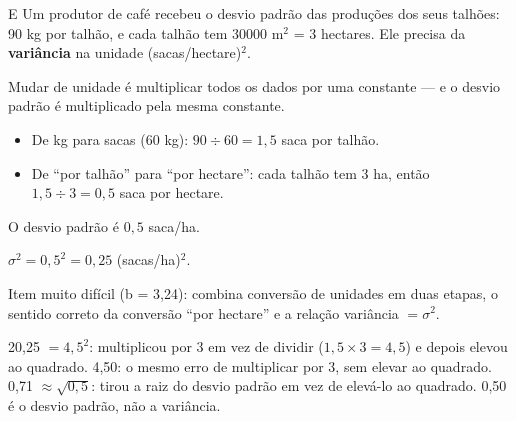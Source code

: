 \begin{resolucao}{E}
 Um produtor de café recebeu o desvio padrão das produções dos seus
talhões: 90 kg por talhão, e cada talhão tem \num{30000} m$^2$ = 3 hectares. Ele precisa da
\textbf{variância} na unidade (sacas/hectare)$^2$.

 Mudar de unidade é multiplicar
todos os dados por uma constante — e o desvio padrão é multiplicado pela mesma constante.
\begin{itemize}[nosep,leftmargin=1.2em]
  \item De kg para sacas (60 kg): $90 \div 60 = 1{,}5$ saca por talhão.
  \item De “por talhão” para “por hectare”: cada talhão tem 3 ha, então $1{,}5 \div 3 = 0{,}5$ saca por hectare.
\end{itemize}
O desvio padrão é $0{,}5$ saca/ha.

 $\sigma^2 = 0{,}5^2 = 0{,}25$ (sacas/ha)$^2$.


Item muito difícil (b = 3,24): combina conversão de unidades em duas etapas, o sentido correto da
conversão “por hectare” e a relação variância $= \sigma^2$.

\begin{distratores}
 20,25 $= 4{,}5^2$: multiplicou por 3 em vez de dividir ($1{,}5 \times 3 = 4{,}5$) e depois elevou ao quadrado.
 4,50: o mesmo erro de multiplicar por 3, sem elevar ao quadrado.
 0,71 $\approx \sqrt{0{,}5}$: tirou a raiz do desvio padrão em vez de elevá-lo ao quadrado.
 0,50 é o desvio padrão, não a variância.
\end{distratores}
\end{resolucao}

\secaoineditas

